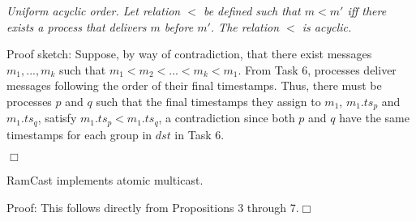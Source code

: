 \begin{proposition}
\textit{Uniform acyclic order.
Let relation $<$ be defined such that $m < m'$ iff there exists a process that delivers $m$ before $m'$.
The relation $<$ is acyclic.}
\end{proposition}
\noindent
{\sc Proof sketch:} 
Suppose, by way of contradiction, that there exist messages $m_1, ..., m_k$ such that $m_1 < m_2 < ... < m_k < m_1$. 
From Task 6, processes deliver messages following the order of their final timestamps.
Thus, there must be processes $p$ and $q$ such that the final timestamps they assign to $m_1$, $m_1.ts_p$ and  $m_1.ts_q$, satisfy $m_1.ts_p < m_1.ts_q$, a contradiction since both $p$ and $q$ have the same timestamps for each group in $dst$ in Task 6.


\hfill$\Box$

\begin{theorem}
RamCast implements atomic multicast.
\end{theorem}
\noindent
{\sc Proof:} 
This follows directly from Propositions 3 through 7.\hfill$\Box$

